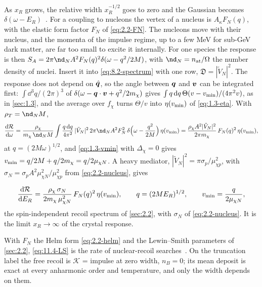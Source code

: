As $x_R$ grows, the relative width $x_R^{-1/2}$ goes to zero and the Gaussian becomes $\delta(\omega - E_R)$~\cite[Eq.~(42)]{campbelldeem2022dark}. For a coupling to nucleons the vertex of a nucleus is $A_\kappa F_N(q)$, with the elastic form factor $F_N$ of \cref{eq:2.2-FN}. The nucleons move with their nucleus, and the momenta of the impulse regime, up to a few MeV for sub-GeV dark matter, are far too small to excite it internally. For one species the response is then $S_A = 2\pi\nd_NA^2F_N(q)^2\delta(\omega - q^2/2M)$, with $\nd_N = n_{\mathrm{at}}/\Omega$ the number density of nuclei. Insert it into \cref{eq:8.2-spectrum} with one row, $\mathfrak{D} = |\tilde V_N|^2$. The response does not depend on $\hat{\bm{q}}$, so the angle between $\bm{q}$ and $\bm{v}$ can be integrated first: $\int\dd^3q/(2\pi)^3$ of $\delta(\omega - \bm{q}\cdot\bm{v} + q^2/2m_{\chi})$ gives $\int q\,\mathrm{d} q\,\Theta(v - v_{\mathrm{min}})/(4\pi^2v)$, as in \cref{sec:1.3}, and the average over $f_\chi$ turns $\Theta/v$ into $\eta(v_{\mathrm{min}})$ of \cref{eq:1.3-eta}. With $\rho_T = \nd_NM$,
\begin{equation*}
  \frac{\dd\mathcal{R}}{\dd\omega} = \frac{\rho_\chi}{\mchi\,\nd_NM}\int\frac{q\,\dd q}{4\pi^2}\,|\tilde V_N|^2\,2\pi\nd_NA^2F_N^2\,\delta\Bigl(\omega - \frac{q^2}{2M}\Bigr)\,\eta(\vmin)
  = \frac{\rho_\chi A^2|\tilde V_N|^2}{2\pi\mchi}\,F_N(q)^2\,\eta(\vmin) ,
\end{equation*}
at $q = (2M\omega)^{1/2}$, and \cref{eq:1.3-vmin} with $\Delta_\chi = 0$ gives $v_{\mathrm{min}} = q/2M + q/2m_{\chi} = q/2\mu_{\chi N}$. A heavy mediator, $|\tilde V_N|^2 = \pi\sigma_p/\mu_{\chi p}^2$, with $\sigma_N = \sigma_pA^2\mu_{\chi N}^2/\mu_{\chi p}^2$ from \cref{eq:2.2-nucleus}, gives
\begin{keyresult}
\begin{equation}
  \frac{\mathrm{d}\mathcal{R}}{\mathrm{d} E_R} = \frac{\rho_\chi\,\sigma_N}{2m_{\chi}\,\mu_{\chi N}^2}\,F_N(q)^2\,\eta(v_{\mathrm{min}}) , \qquad q = (2ME_R)^{1/2} , \qquad v_{\mathrm{min}} = \frac{q}{2\mu_{\chi N}} ,
  \label{eq:11.4-LS}
\end{equation}
the spin-independent recoil spectrum of \cref{sec:2.2}, with $\sigma_N$ of \cref{eq:2.2-nucleus}. It is the limit $x_R \to \infty$ of the crystal response.
\end{keyresult}
\noindent With $F_N$ the Helm form \cref{eq:2.2-helm} and the Lewin--Smith parameters of \cref{sec:2.2}, \cref{eq:11.4-LS} is the rate of nuclear-recoil searches~\cites{lewin1996review}[Eq.~(104)]{lin2019tasi}. On the truncation label the free recoil is $\mathcal{K}$ = impulse at zero width, $n_B = 0$; its mean deposit is exact at every anharmonic order and temperature, and only the width depends on them.


